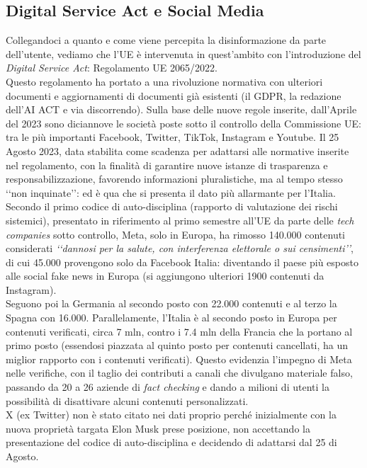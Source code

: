 \documentclass{article}
\begin{document}
\centering\newpage\subsection{Digital Service Act e Social Media}
\begin{justify}
    Collegandoci a quanto e come viene percepita la disinformazione da parte dell'utente, vediamo che l'UE è intervenuta in quest'ambito con l'introduzione del \textit{Digital Service Act}: Regolamento UE 2065/2022.\\
    Questo regolamento ha portato a una rivoluzione normativa con ulteriori documenti e aggiornamenti di documenti già esistenti (il GDPR, la redazione dell'AI ACT e via discorrendo).
    Sulla base delle nuove regole inserite, dall'Aprile del 2023 sono diciannove le società poste sotto il controllo della Commissione UE: tra le più importanti Facebook, Twitter, TikTok, Instagram e Youtube.\citep{dariano_disinformazione_2023}
    Il 25 Agosto 2023, data stabilita come scadenza per adattarsi alle normative inserite nel regolamento, con la finalità di garantire nuove istanze di trasparenza e responsabilizzazione, favorendo informazioni pluralistiche, ma al tempo stesso ‘‘non inquinate’’:
    ed è qua che si presenta il dato più allarmante per l'Italia. Secondo il primo codice di auto-disciplina (rapporto di valutazione dei rischi sistemici), presentato in riferimento al primo semestre all'UE da parte delle \textit{tech companies} sotto controllo, Meta, solo in Europa, ha rimosso 140.000 contenuti considerati \textit{‘‘dannosi per la salute, con interferenza elettorale o sui censimenti’’}, di cui 45.000 provengono solo da Facebook Italia: diventando il paese più esposto alle social fake news in Europa (si aggiungono ulteriori 1900 contenuti da Instagram).\\
    Seguono poi la Germania al secondo posto con 22.000 contenuti e al terzo la Spagna con 16.000.
    Parallelamente, l'Italia è al secondo posto in Europa per contenuti verificati, circa 7 mln, contro i 7.4 mln della Francia che la portano al primo posto (essendosi piazzata al quinto posto per contenuti cancellati, ha un miglior rapporto con i contenuti verificati).
    Questo evidenzia l'impegno di Meta nelle verifiche, con il taglio dei contributi a canali che divulgano materiale falso, passando da 20 a 26 aziende di \textit{fact checking} e dando a milioni di utenti la possibilità di disattivare alcuni contenuti personalizzati.\citep{tg24_fake_2023}\\
    X (ex Twitter) non è stato citato nei dati proprio perché inizialmente con la nuova proprietà targata Elon Musk prese posizione, non accettando la presentazione del codice di auto-disciplina e decidendo di adattarsi dal 25 di Agosto.\\

\end{justify}
\end{document}
